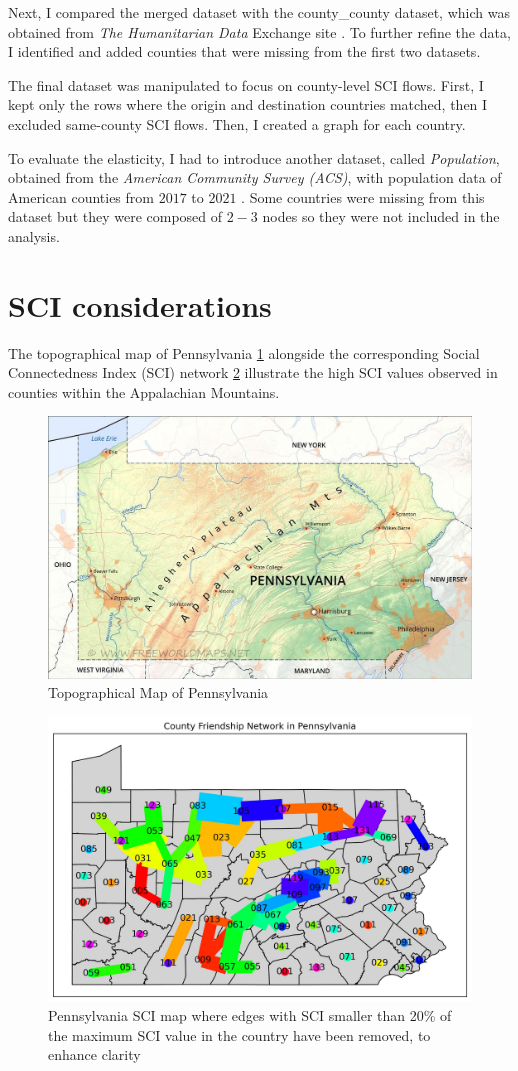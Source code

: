 Next, I compared the merged dataset with the county\_county dataset, which was obtained from \textit{The Humanitarian Data} Exchange site \cite{HUMDataSocialConnectedness}. To further refine the data, I identified and added counties that were missing from the first two datasets.

The final dataset was manipulated to focus on county-level SCI flows. First, I kept only the rows where the origin and destination countries matched, then I excluded same-county SCI flows. Then, I created a graph for each country.

To evaluate the elasticity, I had to introduce another dataset, called \textit{Population}, obtained from the \textit{American Community Survey (ACS)}, with population data of American counties from $2017$  to $2021$ \cite{USCensusACS2021}. Some countries were missing from this dataset but they were composed of $2-3$ nodes so they were not included in the analysis.

\section{SCI considerations}

The topographical map of Pennsylvania \ref{fig:Top_Penn} alongside the corresponding Social Connectedness Index (SCI) network \ref{fig:SCI_filt_Penn} illustrate the high SCI values observed in counties within the Appalachian Mountains.
\begin{figure}[ht]
    \centering
    \includegraphics[width=0.7\linewidth]{images/pennsylvania-map.jpg}
    \caption{Topographical Map of Pennsylvania}
    \label{fig:Top_Penn}
\end{figure}
\begin{figure}[ht]
    \centering
    \includegraphics[width=0.7\linewidth]{images/network_filtered_Pennsylvania.jpg}
    \caption{Pennsylvania SCI map where edges with SCI smaller than 20\% of the maximum SCI value in the country have been removed, to enhance clarity }
    \label{fig:SCI_filt_Penn}
\end{figure}


